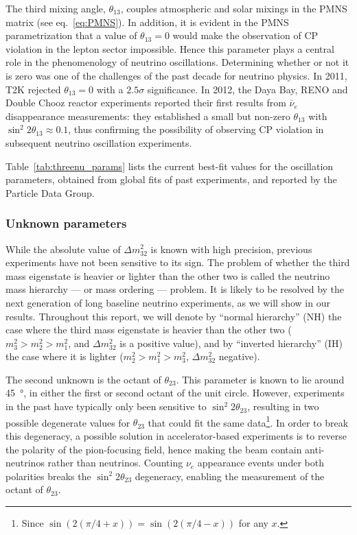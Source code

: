 The third mixing angle, $\theta_{13}$, couples atmospheric and solar
mixings in the PMNS matrix (see eq.~\ref{eq:PMNS}). In addition, it is evident
in the PMNS parametrization that a value of $\theta_{13} = 0$ would make the
observation of CP violation in the lepton sector impossible. Hence this
parameter plays a central role in the phenomenology of neutrino oscillations.
Determining whether or not it is zero was one of the challenges of the past
decade for neutrino physics. In 2011, T2K\cite{t2k-13} rejected $\theta_{13}=0$
with a $2.5\sigma$ significance. In 2012, the Daya Bay\cite{dayabay},
RENO\cite{reno} and Double Chooz\cite{chooz} reactor experiments reported their
first results from $\overline{\nu}_e$ disappearance measurements: they
established a small but non-zero $\theta_{13}$ with $\sin^2 2\theta_{13}
\approx 0.1$, thus confirming the possibility of observing CP violation in
subsequent neutrino oscillation experiments.

Table~\ref{tab:threenu_params} lists the current best-fit values for
the oscillation parameters, obtained from global fits of past experiments,
and reported by the Particle Data Group\cite{pdg}.


\subsubsection{Unknown parameters}
While the absolute value of $\Delta m^2_{32}$ is known with high precision,
previous experiments have not been sensitive to its sign.  The problem of
whether the third mass eigenstate is heavier or lighter than the other two is
called the neutrino mass hierarchy --- or mass ordering --- problem. It is
likely to be resolved by the next generation of long baseline neutrino
experiments, as we will show in our results.  Throughout this report, we will
denote by ``normal hierarchy'' (NH) the case where the third mass eigenstate is
heavier than the other two ($m^2_3 > m^2_2 > m^2_1$, and $\Delta m^2_{32}$ is a
positive value), and by ``inverted hierarchy'' (IH) the case where it is
lighter ($m^2_2 > m^2_1 > m^2_3$, $\Delta m^2_{32}$ negative).

The second unknown is the octant of $\theta_{23}$. This parameter is known to
lie around \SI{45}{\degree}, in either the first or second octant of the unit
circle. However, experiments in the past have typically only been
sensitive to $\sin^2{2 \theta_{23}}$, resulting in two possible degenerate
values for $\theta_{23}$ that could fit the same data\footnote{Since
$\sin(2(\pi/4+x)) = \sin(2(\pi/4-x))$ for any $x$.}.
In order to break this degeneracy, a possible solution in accelerator-based
experiments is to reverse the polarity of the pion-focusing field, hence
making the beam contain anti-neutrinos rather than neutrinos. Counting
$\nu_e$ appearance events under both polarities breaks the $\sin^2 2\theta_{23}$
degeneracy\cite{raut}, enabling the measurement of the octant of $\theta_{23}$.

